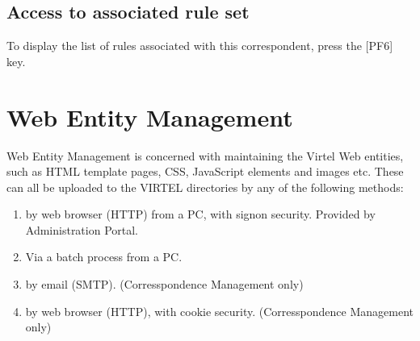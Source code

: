 \documentclass[letterpaper,10pt,english]{sphinxmanual}
\begin{document}
\ignorespaces 

\subsection{Access to associated rule set}
\label{\detokenize{audit_operations_ and_performance:access-to-associated-rule-set}}\label{\detokenize{audit_operations_ and_performance:index-55}}
\sphinxAtStartPar
To display the list of rules associated with this correspondent, press the {[}PF6{]} key.

\newpage
{}\label{\detokenize{audit_operations_ and_performance:v462ap-web-entity-management}}
\ignorespaces 

\section{Web Entity Management}
\label{\detokenize{audit_operations_ and_performance:web-entity-management}}\label{\detokenize{audit_operations_ and_performance:index-56}}
\sphinxAtStartPar
Web Entity Management is concerned with maintaining the Virtel Web entities, such as HTML template pages, CSS, JavaScript elements and images etc. These can all be uploaded to the VIRTEL directories by any of the following methods:
\begin{enumerate}
%
\item {} 
\sphinxAtStartPar
by web browser (HTTP) from a PC, with signon security. Provided by Administration Portal.

\item {} 
\sphinxAtStartPar
Via a batch process from a PC.

\item {} 
\sphinxAtStartPar
by e\sphinxhyphen{}mail (SMTP). (Corresspondence Management only)

\item {} 
\sphinxAtStartPar
by web browser (HTTP), with cookie security. (Corresspondence Management only)

\end{enumerate}
\label{\detokenize{audit_operations_ and_performance:v462ap-http-uploading-pages-signon}}
\ignorespaces 
\end{document}
